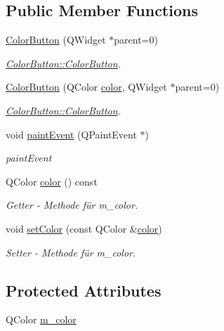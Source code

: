 \subsection*{Public Member Functions}
\begin{DoxyCompactItemize}
\item 
\hyperlink{class_color_button_a128b21900f22efdc9d71d0bffa0b64f8}{Color\+Button} (Q\+Widget $\ast$parent=0)
\begin{DoxyCompactList}\small\item\em \hyperlink{class_color_button_a128b21900f22efdc9d71d0bffa0b64f8}{Color\+Button\+::\+Color\+Button}. \end{DoxyCompactList}\item 
\hyperlink{class_color_button_a16f9cc31b3476fc5cb900e3692d4f49c}{Color\+Button} (Q\+Color \hyperlink{class_color_button_a7583a20c9a126ba93e344ea728c19954}{color}, Q\+Widget $\ast$parent=0)
\begin{DoxyCompactList}\small\item\em \hyperlink{class_color_button_a128b21900f22efdc9d71d0bffa0b64f8}{Color\+Button\+::\+Color\+Button}. \end{DoxyCompactList}\item 
void \hyperlink{class_color_button_ae7b2847c9974fb52f80d54dafc7a0f00}{paint\+Event} (Q\+Paint\+Event $\ast$)
\begin{DoxyCompactList}\small\item\em paint\+Event \end{DoxyCompactList}\item 
Q\+Color \hyperlink{class_color_button_a7583a20c9a126ba93e344ea728c19954}{color} () const
\begin{DoxyCompactList}\small\item\em Getter -\/ Methode für m\+\_\+color. \end{DoxyCompactList}\item 
void \hyperlink{class_color_button_ad0d3747c9ceb3ed57d3f513f42fd4cf2}{set\+Color} (const Q\+Color \&\hyperlink{class_color_button_a7583a20c9a126ba93e344ea728c19954}{color})
\begin{DoxyCompactList}\small\item\em Setter -\/ Methode für m\+\_\+color. \end{DoxyCompactList}\end{DoxyCompactItemize}
\subsection*{Protected Attributes}
\begin{DoxyCompactItemize}
\item 
Q\+Color \hyperlink{class_color_button_aa4408cd251575659e5e8417802f276e4}{m\+\_\+color}
\end{DoxyCompactItemize}


